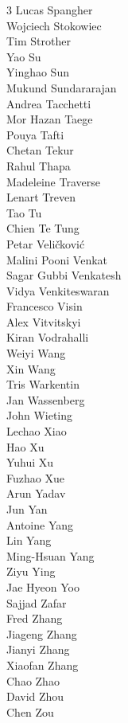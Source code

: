 \begin{multicols}{3}
Lucas Spangher \\ 
Wojciech Stokowiec \\ 
Tim Strother \\ 
Yao Su \\ 
Yinghao Sun \\ 
Mukund Sundararajan \\ 
Andrea Tacchetti \\ 
Mor Hazan Taege \\ 
Pouya Tafti \\ 
Chetan Tekur \\ 
Rahul Thapa \\ 
Madeleine Traverse \\ 
Lenart Treven \\ 
Tao Tu \\ 
Chien Te Tung  \\ 
Petar Veličković \\ 
Malini Pooni Venkat \\ 
Sagar Gubbi Venkatesh \\ 
Vidya Venkiteswaran \\ 
Francesco Visin \\ 
Alex Vitvitskyi \\ 
Kiran Vodrahalli \\ 
Weiyi Wang \\ 
Xin Wang \\ 
Tris Warkentin \\ 
Jan Wassenberg \\ 
John Wieting \\ 
Lechao Xiao \\ 
Hao Xu \\ 
Yuhui Xu \\ 
Fuzhao Xue \\
Arun Yadav \\ 
Jun Yan \\ 
Antoine Yang \\ 
Lin Yang \\ 
Ming-Hsuan Yang \\ 
Ziyu Ying \\ 
Jae Hyeon Yoo \\ 
Sajjad Zafar \\ 
Fred Zhang \\ 
Jiageng Zhang \\ 
Jianyi Zhang \\ 
Xiaofan Zhang \\ 
Chao Zhao \\ 
David Zhou \\ 
Chen Zou \\ 
\end{multicols}
